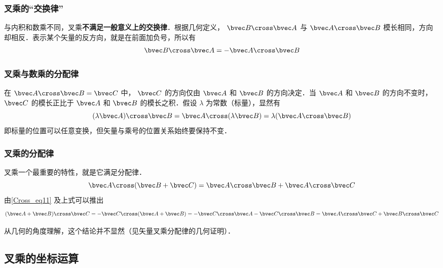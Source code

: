 \subsubsection{叉乘的“交换律”}
与内积和数乘不同，叉乘\textbf{不满足一般意义上的交换律}．根据几何定义， $\bvec B \cross \bvec A$ 与 $\bvec A \cross \bvec B$ 模长相同，方向却相反．表示某个矢量的反方向，就是在前面加负号，所以有
\begin{equation}\label{Cross_eq11}
\bvec B \cross \bvec A = -\bvec A \cross \bvec B
\end{equation}

\subsubsection{叉乘与数乘的分配律}

在 $\bvec A \cross \bvec B = \bvec C$ 中， $\bvec C$ 的方向仅由 $\bvec A$ 和 $\bvec B$ 的方向决定．当 $\bvec A$ 和 $\bvec B$ 的方向不变时， $\bvec C$ 的模长正比于 $\bvec A$ 和 $\bvec B$ 的模长之积．假设 $\lambda $ 为常数（标量），显然有
\begin{equation}
(\lambda \bvec A) \cross \bvec B = \bvec A \cross (\lambda \bvec B) = \lambda (\bvec A \cross \bvec B)
\end{equation}
即标量的位置可以任意变换，但矢量与乘号的位置关系始终要保持不变．

\subsubsection{叉乘的分配律}

叉乘一个最重要的特性，就是它满足分配律．
\begin{equation}\label{Cross_eq6}
\bvec A \cross (\bvec B +\bvec C) = \bvec A \cross \bvec B + \bvec A \cross \bvec C
\end{equation}
由\autoref{Cross_eq11} 及上式可以推出
\begin{equation}\label{Cross_eq7}
(\bvec A + \bvec B) \cross \bvec C =  - \bvec C \cross (\bvec A + \bvec B) =  - \bvec C \cross \bvec A - \bvec C \cross \bvec B = \bvec A \cross \bvec C + \bvec B \cross \bvec C
\end{equation}

从几何的角度理解，这个结论并不显然（见矢量叉乘分配律的几何证明）．

\subsection{叉乘的坐标运算}
